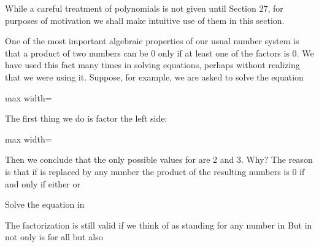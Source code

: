 \documentclass[11pt,oneside]{article}
\begin{document}
\fi
\renewcommand{\BookFooter}{Section 23 Integral Domains}
\ifdefined\BookMaster\else\setcounter{page}{194}\fi
\BookNarrativetrue

\begin{BookBody}


\noindent While a careful treatment of polynomials is not given until Section 27, for purposes of motivation we shall make intuitive use of them in this section.


\noindent One of the most important algebraic properties of our usual number system is that a product of two numbers can be 0 only if at least one of the factors is 0. We have used this fact many times in solving equations, perhaps without realizing that we were using it. Suppose, for example, we are asked to solve the equation

\begin{center}\begin{adjustbox}{max width=\linewidth}\end{adjustbox}\end{center}

\noindent The first thing we do is factor the left side:

\begin{center}\begin{adjustbox}{max width=\linewidth}\end{adjustbox}\end{center}

\noindent Then we conclude that the only possible values for  are 2 and 3. Why? The reason is that if  is replaced by any number  the product  of the resulting numbers is 0 if and only if either  or 

 Solve the equation  in 

 The factorization  is still valid if we think of  as standing for any number in  But in  not only is  for all  but also


\end{BookBody}
\end{document}
